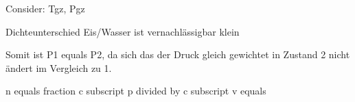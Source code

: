 Consider: Tgz, Pgz

Dichteunterschied Eis/Wasser ist vernachlässigbar klein

Somit ist P1 equals P2, da sich das der Druck gleich gewichtet in Zustand 2 nicht ändert im Vergleich zu 1.

n equals fraction c subscript p divided by c subscript v equals